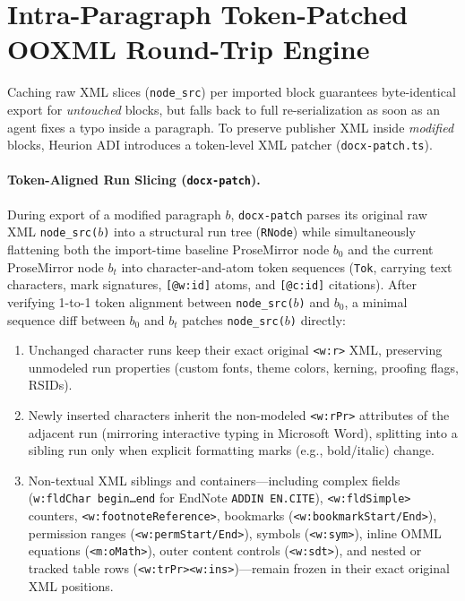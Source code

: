 \documentclass[11pt,a4paper]{article}
\begin{document}
\section{Intra-Paragraph Token-Patched OOXML Round-Trip Engine}
\label{sec:ooxml}

Caching raw XML slices (\texttt{node\_src}) per imported block guarantees byte-identical export for \emph{untouched} blocks, but falls back to full re-serialization as soon as an agent fixes a typo inside a paragraph. To preserve publisher XML inside \emph{modified} blocks, Heurion ADI introduces a token-level XML patcher (\texttt{docx-patch.ts}).

\paragraph{Token-Aligned Run Slicing (\texttt{docx-patch}).}
During export of a modified paragraph $b$, \texttt{docx-patch} parses its original raw XML \texttt{node\_src($b$)} into a structural run tree (\texttt{RNode}) while simultaneously flattening both the import-time baseline ProseMirror node $b_0$ and the current ProseMirror node $b_t$ into character-and-atom token sequences (\texttt{Tok}, carrying text characters, mark signatures, \texttt{[@w:id]} atoms, and \texttt{[@c:id]} citations). After verifying 1-to-1 token alignment between \texttt{node\_src($b$)} and $b_0$, a minimal sequence diff between $b_0$ and $b_t$ patches \texttt{node\_src($b$)} directly:
\begin{enumerate}[leftmargin=1.5em,itemsep=1pt]
  \item Unchanged character runs keep their exact original \texttt{<w:r>} XML, preserving unmodeled run properties (custom fonts, theme colors, kerning, proofing flags, RSIDs).
  \item Newly inserted characters inherit the non-modeled \texttt{<w:rPr>} attributes of the adjacent run (mirroring interactive typing in Microsoft Word), splitting into a sibling run only when explicit formatting marks (e.g., bold/italic) change.
  \item Non-textual XML siblings and containers---including complex fields (\texttt{w:fldChar begin\dots end} for EndNote \texttt{ADDIN EN.CITE}), \texttt{<w:fldSimple>} counters, \texttt{<w:footnote\allowbreak Reference>}, bookmarks (\texttt{<w:bookmark\allowbreak Start/End>}), permission ranges (\texttt{<w:perm\allowbreak Start/End>}), symbols (\texttt{<w:sym>}), inline OMML equations (\texttt{<m:oMath>}), outer content controls (\texttt{<w:sdt>}), and nested or tracked table rows (\texttt{<w:trPr><w:ins>})---remain frozen in their exact original XML positions.
\end{enumerate}
\end{document}

